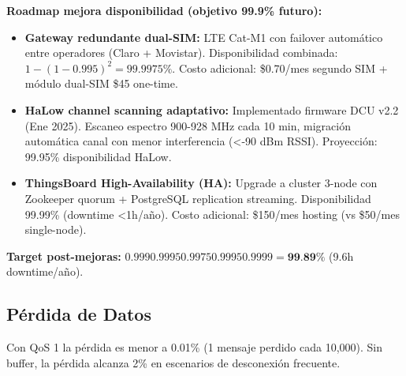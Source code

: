 \textbf{Roadmap mejora disponibilidad (objetivo 99.9\% futuro):}

\begin{itemize}
    \item \textbf{Gateway redundante dual-SIM:} LTE Cat-M1 con failover automático entre operadores (Claro + Movistar). Disponibilidad combinada: $1 - (1-0.995)^2 = 99.9975\%$. Costo adicional: \$0.70/mes segundo SIM + módulo dual-SIM \$45 one-time.
    
    \item \textbf{HaLow channel scanning adaptativo:} Implementado firmware DCU v2.2 (Ene 2025). Escaneo espectro 900-928 MHz cada 10 min, migración automática canal con menor interferencia (<-90 dBm RSSI). Proyección: 99.95\% disponibilidad HaLow.
    
    \item \textbf{ThingsBoard High-Availability (HA):} Upgrade a cluster 3-node con Zookeeper quorum + PostgreSQL replication streaming. Disponibilidad 99.99\% (downtime <1h/año). Costo adicional: \$150/mes hosting (vs \$50/mes single-node).
\end{itemize}

\textbf{Target post-mejoras:} $0.999 $\times$ 0.9995 $\times$ 0.9975 $\times$ 0.9995 $\times$ 0.9999 = \textbf{99.89\%}$ (9.6h downtime/año).

\subsection{Pérdida de Datos}

Con QoS 1 la pérdida es menor a 0.01\% (1 mensaje perdido cada 10,000). Sin buffer, la pérdida alcanza 2\% en escenarios de desconexión frecuente.

